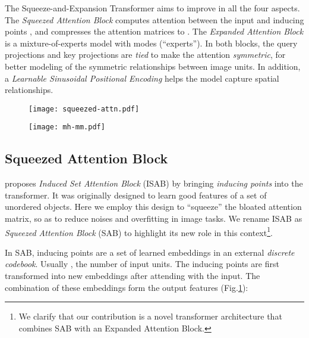 \documentclass{article}
\begin{document}
The Squeeze-and-Expansion Transformer aims to improve in all the four aspects. The \emph{Squeezed Attention Block} computes attention between the input and  inducing points \cite{set-trans}, and compresses the attention matrices to . The \emph{Expanded Attention Block} is a mixture-of-experts model with  modes (``experts''). In both blocks, the query projections and key projections are \emph{tied} to make the attention \emph{symmetric}, for better modeling of the symmetric relationships between image units. In addition, a \emph{Learnable Sinusoidal Positional Encoding} helps the model capture spatial relationships.

\begin{figure}[t]
\centering
  \texttt{[image: squeezed-attn.pdf]}
  \label{fig:sab}
\end{figure}

\begin{figure}[t]
\centering
  \texttt{[image: mh-mm.pdf]}
  \label{fig:eab}
\end{figure}

\subsection{Squeezed Attention Block}
\cite{set-trans} proposes \emph{Induced Set Attention Block} (ISAB) by bringing \emph{inducing points} into the transformer. It was originally designed to learn good features of a set of unordered objects. Here we employ this design to ``squeeze'' the bloated attention matrix, so as to reduce noises and overfitting in image tasks. We rename ISAB as \emph{Squeezed Attention Block} (SAB) to highlight its new role in this context\footnote{We clarify that our contribution is a novel transformer architecture that combines SAB with an Expanded Attention Block.}.

In SAB, inducing points are a set of  learned embeddings  in an external \emph{discrete codebook}. Usually , the number of input units. The inducing points are first transformed into new embeddings  after attending with the input. The combination of these embeddings form the output features  (Fig.\ref{fig:sab}):
\end{document}
